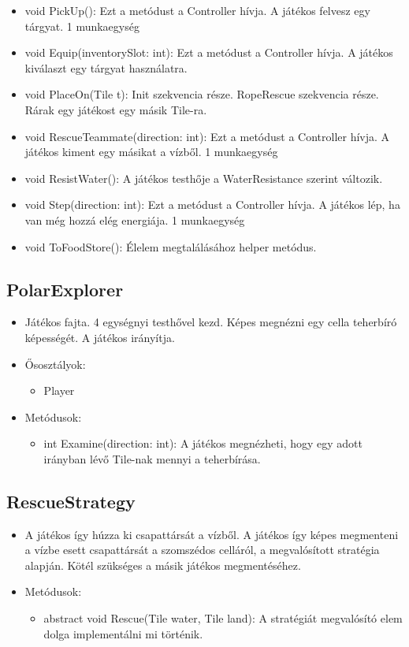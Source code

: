 \begin{itemize}
\begin{itemize}
		\item void PickUp(): Ezt a metódust a Controller hívja. A játékos felvesz egy tárgyat. 1 munkaegység
		\item void Equip(inventorySlot: int): Ezt a metódust a Controller hívja. A játékos kiválaszt egy tárgyat használatra.
		\item void PlaceOn(Tile t): Init szekvencia része. RopeRescue szekvencia része. Rárak egy játékost egy másik Tile-ra.
		\item void RescueTeammate(direction: int): Ezt a metódust a Controller hívja. A játékos kiment egy másikat a vízből. 1 munkaegység
		\item void ResistWater(): A játékos testhője a WaterResistance szerint változik.
		\item void Step(direction: int): Ezt a metódust a Controller hívja. A játékos lép, ha van még hozzá elég energiája. 1 munkaegység
		\item void ToFoodStore(): Élelem megtalálásához helper metódus.
	\end{itemize}
\end{itemize}

\subsection{PolarExplorer}
\begin{itemize}
	\item Játékos fajta. 4 egységnyi testhővel kezd. Képes megnézni egy cella teherbíró képességét. A játékos irányítja.
	\item Ősosztályok:
	\begin{itemize}
		\item Player
	\end{itemize}
	\item Metódusok:
	\begin{itemize}
		\item int Examine(direction: int): A játékos megnézheti, hogy egy adott irányban lévő Tile-nak mennyi a teherbírása.
	\end{itemize}
\end{itemize}

\subsection{RescueStrategy}
\begin{itemize}
		\item A játékos így húzza ki csapattársát a vízből. A játékos így képes megmenteni a vízbe esett csapattársát a szomszédos celláról, a megvalósított stratégia alapján. Kötél szükséges a másik játékos megmentéséhez.
	\item Metódusok:
	\begin{itemize}
		\item abstract void Rescue(Tile water, Tile land): A stratégiát megvalósító elem dolga implementálni mi történik.
	\end{itemize}
\end{itemize}

